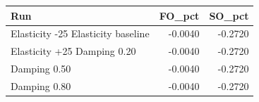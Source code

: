 \begin{tabular}{lrr}
\toprule
Run & FO_pct & SO_pct \\
\midrule
Elasticity -25%
Elasticity baseline & -0.0040 & -0.2720 \\
Elasticity +25%
Damping 0.20 & -0.0040 & -0.2720 \\
Damping 0.50 & -0.0040 & -0.2720 \\
Damping 0.80 & -0.0040 & -0.2720 \\
\bottomrule
\end{tabular}
